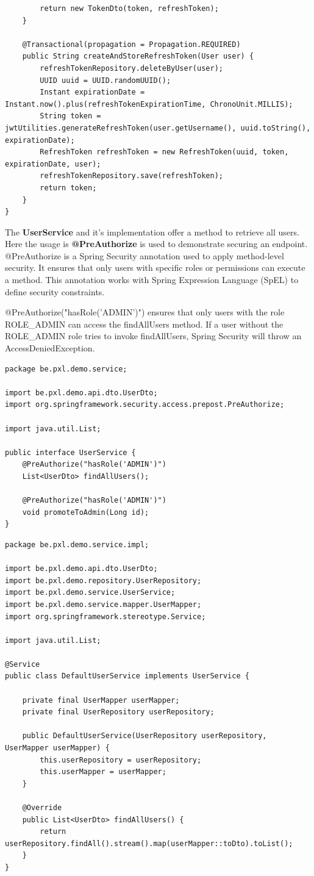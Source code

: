 \begin{lstlisting}
        return new TokenDto(token, refreshToken);
    }

    @Transactional(propagation = Propagation.REQUIRED)
    public String createAndStoreRefreshToken(User user) {
        refreshTokenRepository.deleteByUser(user);
        UUID uuid = UUID.randomUUID();
        Instant expirationDate = Instant.now().plus(refreshTokenExpirationTime, ChronoUnit.MILLIS);
        String token = jwtUtilities.generateRefreshToken(user.getUsername(), uuid.toString(), expirationDate);
        RefreshToken refreshToken = new RefreshToken(uuid, token, expirationDate, user);
        refreshTokenRepository.save(refreshToken);
        return token;
    }
}
\end{lstlisting}


The \textbf{UserService} and it's implementation offer a method to retrieve all users. Here the usage is \textbf{@PreAuthorize} is used to demonstrate securing an endpoint. 
  @PreAuthorize is a Spring Security annotation used to apply method-level security. It ensures that only users with specific roles or permissions can execute a method. This annotation works with Spring Expression Language (SpEL) to define security constraints.

@PreAuthorize("hasRole('ADMIN')") ensures that only users with the role ROLE\_ADMIN can access the findAllUsers method.
If a user without the ROLE\_ADMIN role tries to invoke findAllUsers, Spring Security will throw an AccessDeniedException.

\begin{lstlisting}
package be.pxl.demo.service;

import be.pxl.demo.api.dto.UserDto;
import org.springframework.security.access.prepost.PreAuthorize;

import java.util.List;

public interface UserService {
    @PreAuthorize("hasRole('ADMIN')")
    List<UserDto> findAllUsers();

    @PreAuthorize("hasRole('ADMIN')")
    void promoteToAdmin(Long id);
}
\end{lstlisting}

\begin{lstlisting}
package be.pxl.demo.service.impl;

import be.pxl.demo.api.dto.UserDto;
import be.pxl.demo.repository.UserRepository;
import be.pxl.demo.service.UserService;
import be.pxl.demo.service.mapper.UserMapper;
import org.springframework.stereotype.Service;

import java.util.List;

@Service
public class DefaultUserService implements UserService {

    private final UserMapper userMapper;
    private final UserRepository userRepository;

    public DefaultUserService(UserRepository userRepository, UserMapper userMapper) {
        this.userRepository = userRepository;
        this.userMapper = userMapper;
    }

    @Override
    public List<UserDto> findAllUsers() {
        return userRepository.findAll().stream().map(userMapper::toDto).toList();
    }
}
\end{lstlisting}

